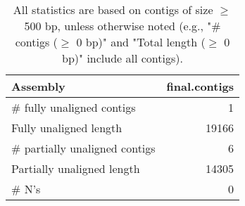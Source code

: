 \documentclass[12pt,a4paper]{article}
\begin{document}
\begin{table}[ht]
\begin{center}
\caption{All statistics are based on contigs of size $\geq$ 500 bp, unless otherwise noted (e.g., "\# contigs ($\geq$ 0 bp)" and "Total length ($\geq$ 0 bp)" include all contigs).}
\begin{tabular}{|l*{1}{|r}|}
\hline
Assembly & final.contigs \\ \hline
\# fully unaligned contigs & 1 \\ \hline
Fully unaligned length & 19166 \\ \hline
\# partially unaligned contigs & 6 \\ \hline
Partially unaligned length & 14305 \\ \hline
\# N's & 0 \\ \hline
\end{tabular}
\end{center}
\end{table}
\end{document}
